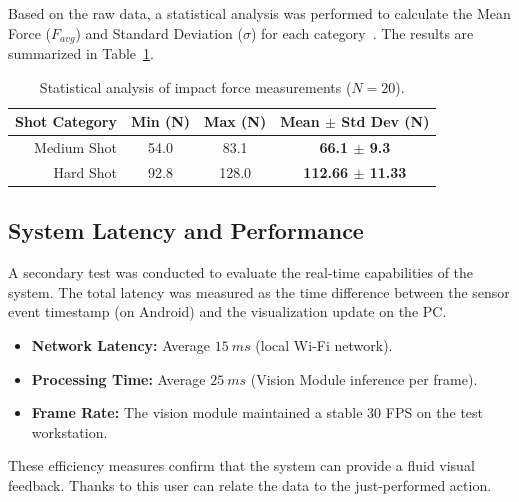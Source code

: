 Based on the raw data, a statistical analysis was performed to calculate the Mean Force ($F_{avg}$) and Standard Deviation ($\sigma$) for each category~\cite{bib:stapor}. The results are summarized in Table~\ref{tab:force_results}.

\begin{table}[h!]
\centering
\caption{Statistical analysis of impact force measurements ($N=20$).}
\label{tab:force_results}
\begin{tabular}{rccc}
\toprule
\textbf{Shot Category} & \textbf{Min (N)} & \textbf{Max (N)} & \textbf{Mean $\pm$ Std Dev (N)} \\
\midrule
Medium Shot &  54.0 & 83.1 & \textbf{66.1 $\pm$ 9.3} \\
Hard Shot   &  92.8 & 128.0 & \textbf{112.66 $\pm$ 11.33} \\
\bottomrule
\end{tabular}
\end{table}

\subsection{System Latency and Performance}
A secondary test was conducted to evaluate the real-time capabilities of the system. The total latency was measured as the time difference between the sensor event timestamp (on Android) and the visualization update on the PC.

\begin{itemize}
    \item \textbf{Network Latency:} Average $15~ms$ (local Wi-Fi network).
    \item \textbf{Processing Time:} Average $25~ms$ (Vision Module inference per frame).
    \item \textbf{Frame Rate:} The vision module maintained a stable 30 FPS on the test workstation.
\end{itemize}

These efficiency measures confirm that the system can provide a fluid visual feedback. Thanks to this user can relate the data to the just-performed action.